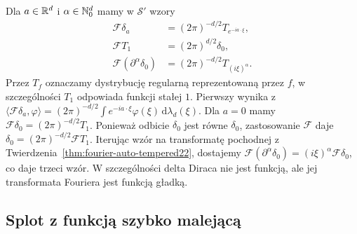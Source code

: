 \begin{przyklad}
\label{ex:fourier-delta22}
Dla $a\in\mathbb R^d$ i $\alpha\in\mathbb N_0^d$ mamy w $\mathcal S'$
wzory
\[
\begin{aligned}
\mathcal F\delta_a&=(2\pi)^{-d/2}T_{e^{-ia\cdot\xi}},\\
\mathcal F T_1&=(2\pi)^{d/2}\delta_0,\\
\mathcal F(\partial^\alpha\delta_0)
&=(2\pi)^{-d/2}T_{(i\xi)^\alpha}.
\end{aligned}
\]
Przez $T_f$ oznaczamy dystrybucję regularną
reprezentowaną przez $f$, w szczególności $T_1$
odpowiada funkcji stałej $1$.
Pierwszy wynika z
$\langle\mathcal F\delta_a,\varphi\rangle
=(2\pi)^{-d/2}\int e^{-ia\cdot\xi}\varphi(\xi)
\,\mathrm d\lambda_d(\xi)$.
Dla $a=0$ mamy $\mathcal F\delta_0=(2\pi)^{-d/2}T_1$.
Ponieważ odbicie $\delta_0$ jest równe $\delta_0$,
zastosowanie $\mathcal F$ daje
$\delta_0=(2\pi)^{-d/2}\mathcal F T_1$.
Iterując wzór na transformatę pochodnej z
Twierdzenia~\ref{thm:fourier-auto-tempered22}, dostajemy
$\mathcal F(\partial^\alpha\delta_0)
=(i\xi)^\alpha\mathcal F\delta_0$, co daje trzeci wzór.
W szczególności delta Diraca nie jest funkcją,
ale jej transformata Fouriera jest funkcją gładką.
\end{przyklad}

\subsection{Splot z funkcją szybko malejącą}

